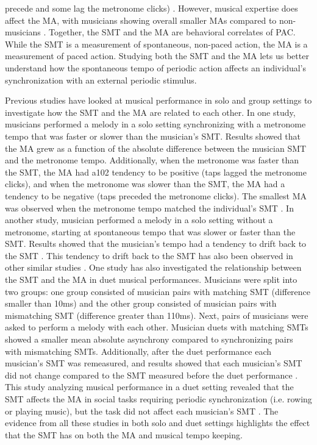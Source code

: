 \documentclass{report}
\begin{document}
precede and some lag the metronome clicks) \cite{baaaath2016estimating}. However, musical expertise does affect the MA, with musicians showing overall smaller MAs compared to non-musicians \cite{repp2007tapping}. Together, the SMT and the MA are behavioral correlates of PAC. While the SMT is a measurement of spontaneous, non-paced action, the MA is a measurement of paced action. Studying both the SMT and the MA lets us better understand how the spontaneous tempo of periodic action affects an individual's synchronization with an external periodic stimulus.

Previous studies have looked at musical performance in solo and group settings to investigate how the SMT and the MA are related to each other. In one study, musicians performed a melody in a solo setting synchronizing with a metronome tempo that was faster or slower than the musician's SMT. Results showed that the MA grew as a function of the absolute difference between the musician SMT and the metronome tempo. Additionally, when the metronome was faster than the SMT, the MA had a102 tendency to be positive (taps lagged the metronome clicks), and when the metronome was slower than the SMT, the MA had a tendency to be negative (taps preceded the metronome clicks). The smallest MA was observed when the metronome tempo matched the individual's SMT \cite{scheurich2018tapping}. In another study, musician performed a melody in a solo setting without a metronome, starting at spontaneous tempo that was slower or faster than the SMT. Results showed that the musician's tempo had a tendency to drift back to the SMT \cite{zamm2018musicians}. This tendency to drift back to the SMT has also been observed in other similar studies \cite{mcauley2006time, yu2003task}. One study has also investigated the relationship between the SMT and the MA in duet musical performances. Musicians were split into two groups: one group consisted of musician pairs with matching SMT (difference smaller than 10ms) and the other group consisted of musician pairs with mismatching SMT (difference greater than 110ms). Next, pairs of musicians were asked to perform a melody with each other. Musician duets with matching SMTs showed a smaller mean absolute asynchrony compared to synchronizing pairs with mismatching SMTs. Additionally, after the duet performance each musician's SMT was remeasured, and results showed that each musician's SMT did not change compared to the SMT measured before the duet performance \cite{zamm2016endogenous}. This study analyzing musical performance in a duet setting revealed that the SMT affects the MA in social tasks requiring periodic synchronization (i.e. rowing or playing music), but the task did not affect each musician's SMT \cite{zamm2016endogenous}. The evidence from all these studies in both solo and duet settings highlights the effect that the SMT has on both the MA and musical tempo keeping.
\end{document}
